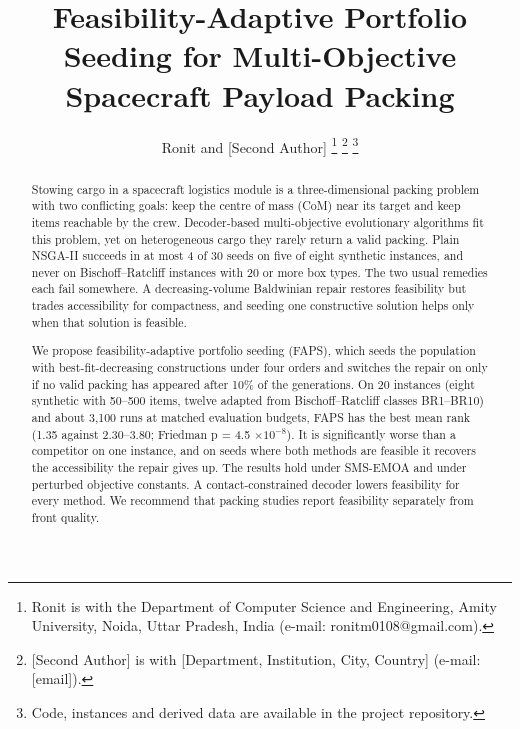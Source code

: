 \documentclass[journal]{IEEEtran}
\begin{document}
\title{Feasibility-Adaptive Portfolio Seeding for Multi-Objective Spacecraft Payload Packing}

\author{Ronit and [Second Author]%
\thanks{Ronit is with the Department of Computer Science and Engineering, Amity University, Noida, Uttar Pradesh, India (e-mail: ronitm0108@gmail.com).}%
\thanks{[Second Author] is with [Department, Institution, City, Country] (e-mail: [email]).}%
\thanks{Code, instances and derived data are available in the project repository.}}


\maketitle

\begin{abstract}
Stowing cargo in a spacecraft logistics module is a three-dimensional packing problem with two conflicting goals: keep the centre of mass (CoM) near its target and keep items reachable by the crew. Decoder-based multi-objective evolutionary algorithms fit this problem, yet on heterogeneous cargo they rarely return a valid packing. Plain NSGA-II succeeds in at most 4 of 30 seeds on five of eight synthetic instances, and never on Bischoff--Ratcliff instances with 20 or more box types. The two usual remedies each fail somewhere. A decreasing-volume Baldwinian repair restores feasibility but trades accessibility for compactness, and seeding one constructive solution helps only when that solution is feasible.

We propose feasibility-adaptive portfolio seeding (FAPS), which seeds the population with best-fit-decreasing constructions under four orders and switches the repair on only if no valid packing has appeared after 10\% of the generations. On 20 instances (eight synthetic with 50--500 items, twelve adapted from Bischoff--Ratcliff classes BR1--BR10) and about 3,100 runs at matched evaluation budgets, FAPS has the best mean rank (1.35 against 2.30--3.80; Friedman p = 4.5 \(\times 10^{-8}\)). It is significantly worse than a competitor on one instance, and on seeds where both methods are feasible it recovers the accessibility the repair gives up. The results hold under SMS-EMOA and under perturbed objective constants. A contact-constrained decoder lowers feasibility for every method. We recommend that packing studies report feasibility separately from front quality.
\end{abstract}
\end{document}
